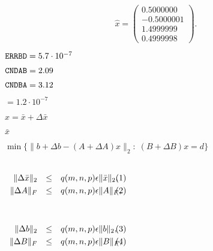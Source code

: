 {\newpage\clearpage
{}%
\begin{displaymath}  \widehat {x} = \left( \begin{array}{r}
                             0.5000000 \\
                            -0.5000001 \\
                             1.4999999 \\
                             0.4999998
                        \end{array} \right).\end{displaymath}%
\lthtmldisplayZ
\lthtmlcheckvsize\clearpage}

{\newpage\clearpage
{}%
${\tt ERRBD} = 5.7\cdot10^{-7}$%
\lthtmlinlinemathZ
\lthtmlcheckvsize\clearpage}

{\newpage\clearpage
{}%
${\tt CNDAB} = 2.09$%
\lthtmlinlinemathZ
\lthtmlcheckvsize\clearpage}

{\newpage\clearpage
{}%
${\tt CNDBA} = 3.12$%
\lthtmlinlinemathZ
\lthtmlcheckvsize\clearpage}

{\newpage\clearpage
{}%
$= 1.2\cdot10^{-7}$%
\lthtmlinlinemathZ
\lthtmlcheckvsize\clearpage}

{\newpage\clearpage
{}%
$\widehat {x} = \bar {x} + \Delta \bar {x}$%
\lthtmlinlinemathZ
\lthtmlcheckvsize\clearpage}

{\newpage\clearpage
{}%
$\bar {x}$%
\lthtmlinlinemathZ
\lthtmlcheckvsize\clearpage}

{\newpage\clearpage
{}%
$\min\{\| b + \Delta b - (A + \Delta A)x \|_2: \; (B + \Delta B)x = d \} $%
\lthtmlinlinemathZ
\lthtmlcheckvsize\clearpage}

{\newpage\clearpage
{}%
$\textstyle \parbox{2in}{
  \begin{eqnarray*}
  \| \Delta \bar {x} \|_2 & \leq & q(m,n,p) \epsilon\|\bar {x}\|_2, \\
  \| \Delta A \|_F & \leq & q(m,n,p)\epsilon\|A\|_F,
  \end{eqnarray*} }$%
\lthtmlinlinemathZ
\lthtmlcheckvsize\clearpage}

{\newpage\clearpage
{}%
$\textstyle \parbox{2in}{
  \begin{eqnarray*}
  \| \Delta b \|_2 & \leq & q(m,n,p)\epsilon\|b\|_2, \\
  \| \Delta B \|_F & \leq & q(m,n,p)\epsilon\|B\|_F,
  \end{eqnarray*}
}$%
\lthtmlinlinemathZ
\lthtmlcheckvsize\clearpage}

